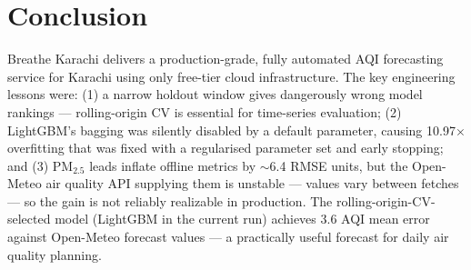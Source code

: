 \documentclass[11pt,a4paper]{article}
\begin{document}
\section{Conclusion}

Breathe Karachi delivers a production-grade, fully automated AQI forecasting
service for Karachi using only free-tier cloud infrastructure. The key engineering
lessons were: (1) a narrow holdout window gives dangerously wrong model rankings —
rolling-origin CV is essential for time-series evaluation; (2) LightGBM's bagging
was silently disabled by a default parameter, causing 10.97$\times$ overfitting
that was fixed with a regularised parameter set and early stopping; and (3)
PM$_{2.5}$ leads inflate offline metrics by $\sim$6.4 RMSE units, but the
Open-Meteo air quality API supplying them is unstable — values vary between
fetches — so the gain is not reliably realizable in production.  The rolling-origin-CV-selected model (LightGBM in the current run) achieves
3.6 AQI mean error against Open-Meteo forecast values — a practically useful
forecast for daily air quality planning.
\end{document}
